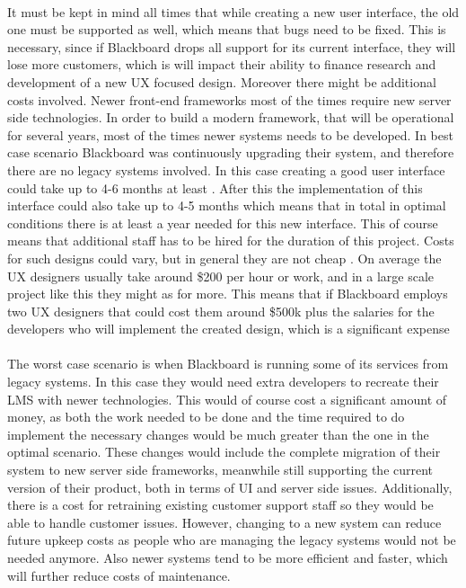 \documentclass[]{article}
\begin{document}
\paragraph{}
It must be kept in mind all times that while creating a new user interface, the old one must be supported as well, which means that bugs need to be fixed. This is necessary, since if Blackboard drops all support for its current interface, they will lose more customers, which is will impact their ability to finance research and development of a new UX focused design. Moreover there might be additional costs involved. Newer front-end frameworks most of the times require new server side technologies. In order to build a modern framework, that will be operational for several years, most of the times newer systems needs to be developed. In best case scenario Blackboard was continuously upgrading their system, and therefore there are no legacy systems involved. In this case creating a good user interface could take up to 4-6 months at least \cite{UX-30000}. After this the implementation of this interface could also take up to 4-5 months \cite{Webredesign-adv} which means that in total in optimal conditions there is at least a year needed for this new interface. This of course means that additional staff has to be hired for the duration of this project. Costs for such designs could vary, but in general they are not cheap \cite{UX-cost}. On average the UX designers usually take around \$200 per hour or work, and in a large scale project like this they might as for more. This means that if Blackboard employs two UX designers that could cost them around \$500k plus the salaries for the developers who will implement the created design, which is a significant expense 

\paragraph{}
The worst case scenario is when Blackboard is running some of its services from legacy systems. In this case they would need extra developers to recreate their LMS with newer technologies. This would of course cost a significant amount of money, as both the work needed to be done and the time required to do implement the necessary changes would be much greater than the one in the optimal scenario. These changes would include the complete migration of their system to new server side frameworks, meanwhile still supporting the current version of their product, both in terms of UI and server side issues. Additionally, there is a cost for retraining existing customer support staff so they would be able to handle customer issues. However, changing to a new system can reduce future upkeep costs as people who are managing the legacy systems would not be needed anymore. Also newer systems tend to be more efficient and faster, which will further reduce costs of maintenance. 
\end{document}
